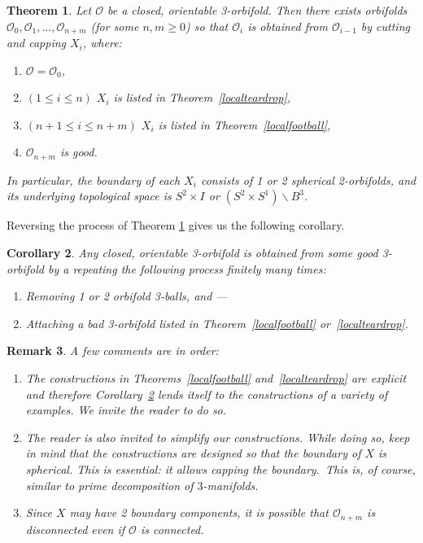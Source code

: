 \documentclass[12pt,reqno]{amsart}
\theoremstyle{plain}
\theoremstyle{definition}
\numberwithin{subcase}{case}
\theoremstyle{plain}
\newtheorem{thm}{Theorem}[section]  %
\newtheorem{corll}[thm]{Corollary}
\newtheorem{remark}[thm]{Remark}
\theoremstyle{definition}
\newcommand{\OO}{\mathcal{O}}
\begin{document}
\begin{thm}
Let $\OO$ be a closed, orientable 3-orbifold. Then there exists orbifolds $\OO_0,\OO_1,\dots,\OO_{n+m}$ (for some $n,m\geq0$) so that $\OO_i$ is obtained from $\OO_{i-1}$ by cutting and capping $X_i$, where:
\begin{enumerate}
\item $\OO=\OO_0$,
\item $(1\leq i\leq n)$ $X_i$ is listed in Theorem~\ref{localteardrop},
\item $(n+1\leq i\leq n+m)$ $X_i$ is listed in Theorem~\ref{localfootball},
\item $\OO_{n+m}$ is good.
\end{enumerate}
In particular, the boundary of each $X_i$ consists of 1 or 2 spherical 2-orbifolds, and its underlying topological space is $S^2\times I$ or $(S^2\times S^1)\backslash B^3$.
\label{mainthm}
\end{thm} 

Reversing the process of Theorem \ref{mainthm} gives us the following corollary.

\begin{corll}
\label{cor:ConstructingBadOrbifolds}
Any closed, orientable 3-orbifold is obtained from some good 3-orbifold by a repeating the following process finitely many times:
	\begin{enumerate}
	\item  Removing 1 or 2 orbifold 3-balls, and ---
	\item Attaching a bad 3-orbifold listed in Theorem~\ref{localfootball} or~\ref{localteardrop}. 
	\end{enumerate}
\end{corll}

\begin{remark}
{\rm A few comments are in order:
\begin{enumerate}

\item The constructions in Theorems~\ref{localfootball} and~\ref{localteardrop} are explicit and therefore Corollary~\ref{cor:ConstructingBadOrbifolds} lends itself to the constructions of a variety of examples.  We invite the reader to do so.

\item The reader is also invited to simplify our constructions.  While doing so, keep in mind that the constructions are designed so that the boundary of \(X\) is spherical.  This is essential: it allows \em capping the boundary.\em\ This is, of course, similar to prime decomposition of \(3\)-manifolds.

 \item Since $X$ may have 2 boundary components, it is possible that \(\OO_{n+m}\) is disconnected even if \(\OO\) is connected.
\end{enumerate}
}
\end{remark}
\end{document}
